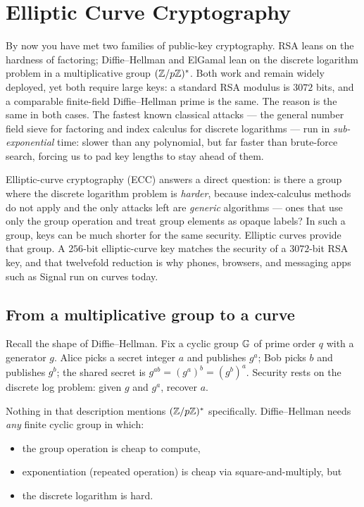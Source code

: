 \chapter{Elliptic Curve Cryptography}

By now you have met two families of public-key cryptography. RSA leans on the hardness
of factoring; Diffie--Hellman and ElGamal lean on the discrete logarithm problem in a
multiplicative group $(\mathbb{Z}/p\mathbb{Z})^{*}$. Both work and remain widely deployed, yet both require
large keys: a standard RSA modulus is $3072$ bits, and a comparable finite-field
Diffie--Hellman prime is the same. The reason is the same in both cases. The fastest
known classical attacks --- the general number field sieve for factoring and index
calculus for discrete logarithms --- run in \emph{sub-exponential} time: slower than any
polynomial, but far faster than brute-force search, forcing us to pad key lengths to stay
ahead of them.

Elliptic-curve cryptography (ECC) answers a direct question: is there a group where the
discrete logarithm problem is \emph{harder}, because index-calculus methods do not apply
and the only attacks left are \emph{generic} algorithms --- ones that use only the group
operation and treat group elements as opaque labels? In such a group, keys can be much
shorter for the same security. Elliptic curves provide that group. A $256$-bit
elliptic-curve key matches the security of a $3072$-bit RSA key, and that twelvefold
reduction is why phones, browsers, and messaging apps such as Signal run on curves today.

\chapterline

\section{From a multiplicative group to a curve}
\label{ch21:motivation}

Recall the shape of Diffie--Hellman. Fix a cyclic group $\mathbb{G}$ of prime order $q$ with a
generator $g$. Alice picks a secret integer $a$ and publishes $g^a$; Bob picks $b$ and
publishes $g^b$; the shared secret is $g^{ab} = (g^a)^b = (g^b)^a$. Security rests on the
discrete log problem: given $g$ and $g^a$, recover $a$.

Nothing in that description mentions $(\mathbb{Z}/p\mathbb{Z})^{*}$ specifically. Diffie--Hellman needs
\emph{any} finite cyclic group in which:

\begin{itemize}
  \item the group operation is cheap to compute,
  \item exponentiation (repeated operation) is cheap via square-and-multiply, but
  \item the discrete logarithm is hard.
\end{itemize}

